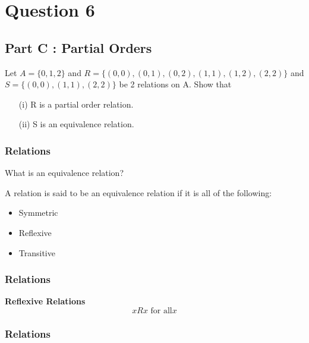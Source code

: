 \documentclass[]{report}
\begin{document}
\section*{Question 6}



\subsection*{Part C : Partial Orders}

Let $A=\{0,1,2\}$ and $R=\{ (0,0),(0,1),(0,2),(1,1), (1,2), (2,2)\}$
and $S=\{(0,0),(1,1),(2,2)\}$ be 2 relations on A. Show that

\begin{itemize}
\item[(i)] R is a partial order relation.
\item[(ii)] S is an equivalence relation.
\end{itemize}




\subsubsection{Relations}

What is an equivalence relation?\\
\bigskip

A relation is said to be an equivalence relation if it is all of the following:
\begin{itemize}
\item Symmetric
\item Reflexive
\item Transitive
\end{itemize}



\subsubsection{Relations}

\textbf{Reflexive Relations}
\[ xRx \mbox{ for all} x\]


\subsubsection{Relations}
\end{document}
